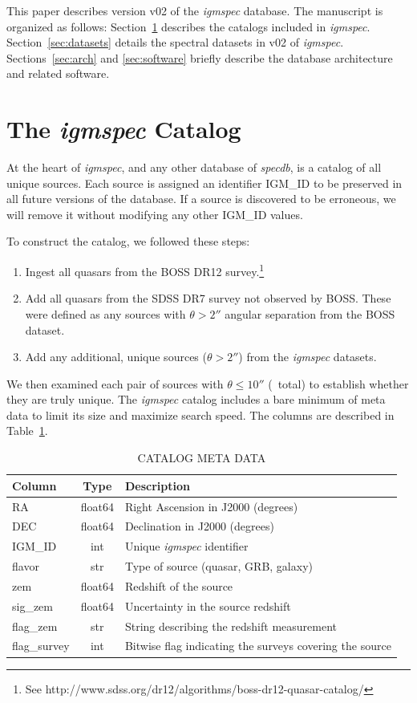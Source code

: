 \documentclass[12pt]{elsarticle}
\begin{document}
This paper describes version v02 of the {\it igmspec}
database.  The manuscript is organized as follows:
Section~\ref{sec:catalog} describes the catalogs
included in {\it igmspec}.
Section~\ref{sec:datasets} details the spectral datasets
in v02 of {\it igmspec}.
Sections~\ref{sec:arch} and \ref{sec:software}
briefly describe the database architecture and
related software.



\section{The {\it igmspec} Catalog}
\label{sec:catalog}

At the heart of {\it igmspec}, and any other database  
of {\it specdb}, is a catalog of all unique sources.
Each source is assigned an identifier IGM\_ID to be
preserved in all future versions of the database.
If a source is discovered to be erroneous, 
we will remove it without modifying
any other IGM\_ID values.

To construct the catalog, we followed these steps:

\begin{enumerate}
\item Ingest all quasars from the BOSS DR12 survey.\footnote{See
http://www.sdss.org/dr12/algorithms/boss-dr12-quasar-catalog/}
\item Add all quasars from the SDSS DR7 survey not observed by BOSS.
These were defined as any sources with $\theta > 2''$ angular separation
from the BOSS dataset.
\item Add any additional, unique sources ($\theta > 2''$)
from the {\it igmspec} datasets.
\end{enumerate}
We then examined each pair of sources with $\theta \le 10''$ 
(\npair\ total) to establish whether they are truly unique.
The {\it igmspec} catalog includes a bare minimum of meta data
to limit its size and maximize search speed.
The columns are described in Table~\ref{tab:cat_keys}.

 
\begin{table}
\caption{CATALOG META DATA\label{tab:cat_keys}}
\footnotesize
\begin{tabular}{lcl}
Column & Type  & Description \\
\hline
RA           & float64 & Right Ascension in J2000 (degrees) \\
DEC          & float64 & Declination in J2000 (degrees) \\
IGM\_ID      & int     & Unique {\it igmspec} identifier \\
flavor       & str     & Type of source (quasar, GRB, galaxy) \\
zem          & float64 & Redshift of the source \\
sig\_zem     & float64 & Uncertainty in the source redshift \\
flag\_zem    & str     & String describing the redshift measurement \\
flag\_survey & int     & Bitwise flag indicating the surveys covering the source \\
\hline
\end{tabular}
\end{table}
\end{document}
